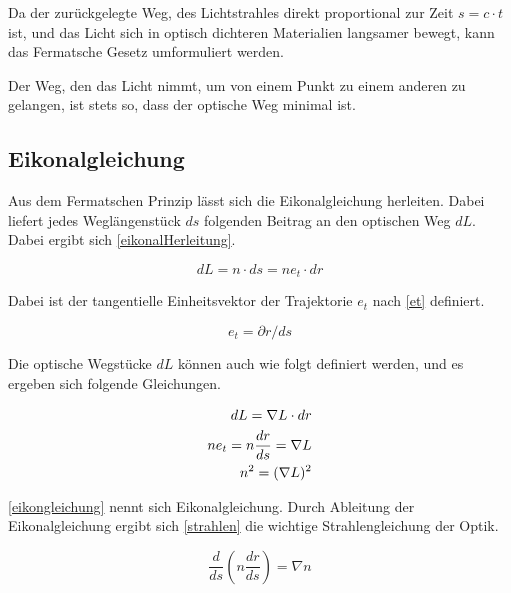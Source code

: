 Da der zurückgelegte Weg, des Lichtstrahles direkt proportional zur Zeit $s = c \cdot t$ ist,
und das Licht sich in optisch dichteren Materialien langsamer bewegt,
kann das Fermatsche Gesetz umformuliert werden\cite{Definition}. 


\begin{definition}
Der Weg, den das Licht nimmt, 
um von einem Punkt zu einem anderen zu gelangen, 
ist stets so, dass der optische Weg minimal ist.
\end{definition}

\subsection{Eikonalgleichung}

Aus dem Fermatschen Prinzip lässt sich die Eikonalgleichung herleiten.
Dabei liefert jedes Weglängenstück $ds$ folgenden Beitrag an den optischen Weg $dL$. 
Dabei ergibt sich \eqref{eikonalHerleitung}.

\begin{equation}
	dL = n \cdot ds = n e_t \cdot dr
	\label{eikonalHerleitung}
\end{equation}

Dabei ist der tangentielle Einheitsvektor der Trajektorie $e_t$ nach  \eqref{et} definiert.

\begin{equation}
	e_t = \partial r / ds
	\label{et}
\end{equation}

Die optische Wegstücke $dL$ können auch wie folgt  definiert werden, 
und es ergeben sich folgende Gleichungen.

\begin{align}
	dL = \nabla L \cdot dr \notag \\
	n e_t = n \frac{dr}{ds} = \nabla L \notag \\
	n^2 = (\nabla L)^2 \label{eikongleichung}
\end{align}

\eqref{eikongleichung} nennt sich Eikonalgleichung.
Durch Ableitung der Eikonalgleichung ergibt sich \eqref{strahlen} die wichtige Strahlengleichung der Optik.

\begin{equation}
	\frac{d}{ds} \left ( n \frac{dr}{ds} \right ) = \nabla n
	\label{strahlen}
\end{equation}

